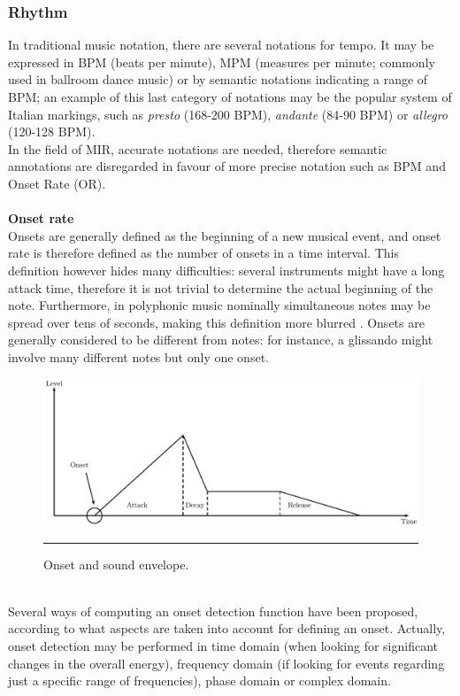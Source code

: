 \subsubsection{Rhythm}
In traditional music notation, there are several notations for tempo. It may be expressed in BPM (beats per minute), MPM (measures per minute; commonly used in ballroom dance music) or by semantic notations indicating a range of BPM; an example of this last category of notations may be the popular system of Italian markings, such as \textit{presto} (168-200 BPM), \textit{andante} (84-90 BPM) or \textit{allegro} (120-128 BPM). \\ In the field of MIR, accurate notations are needed, therefore semantic annotations are disregarded in favour of more precise notation such as BPM and Onset Rate (OR).
\\ \\ 
\textbf{Onset rate} \\ 
Onsets are generally defined as the beginning of a new musical event, and onset rate is therefore defined as the number of onsets in a time interval. This definition however hides many difficulties: several instruments might have a long attack time, therefore it is not trivial to determine the actual beginning of the note. Furthermore, in polyphonic music nominally simultaneous notes may be spread over tens of seconds, making this definition more blurred \cite{dixon06}. Onsets are generally considered to be different from notes: for instance, a glissando might involve many different notes but only one onset.
\begin{figure}[h]
\begin{center}
\includegraphics[scale=0.75]{Figures/onsets.pdf}
    \rule{20em}{0.5pt}
  \caption[Onset and sound envelope]{Onset and sound envelope.}
  \label{fig:Onsets}
\end{center}
\end{figure} \\
Several ways of computing an onset detection function have been proposed, according to what aspects are taken into account for defining an onset. Actually, onset detection may be performed in time domain (when looking for significant changes in the overall energy), frequency domain (if looking for events regarding just a specific range of frequencies), phase domain or complex domain. 

